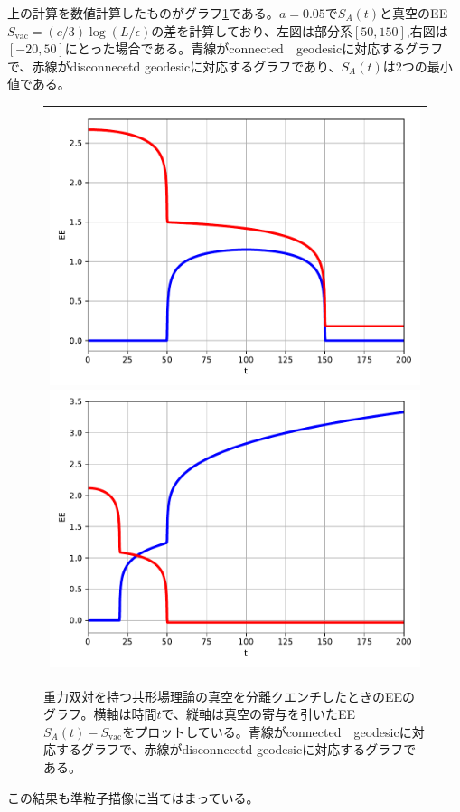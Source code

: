 上の計算を数値計算したものがグラフ\ref{fig:sh005}である。$a=0.05$で$S_A(t)$と真空のEE$S_\text{vac}=(c/3)\log(L/\epsilon)$の差を計算しており、左図は部分系$[50,150]$,右図は$[-20,50]$にとった場合である。青線がconnected　geodesicに対応するグラフで、赤線がdisconnecetd geodesicに対応するグラフであり、$S_A(t)$は2つの最小値である。
\begin{figure}[h]
	\centering
	\begin{tabular}{c}
		\begin{minipage}{0.50\hsize}
			\centering
			\includegraphics[width=\linewidth]{sh005_50_150.pdf}
		\end{minipage}
		\begin{minipage}{0.50\hsize}
			\centering
			\includegraphics[width=\linewidth]{sh005_20_50.pdf}
		\end{minipage}
	\end{tabular}
	\caption{重力双対を持つ共形場理論の真空を分離クエンチしたときのEEのグラフ。横軸は時間$t$で、縦軸は真空の寄与を引いたEE $S_A(t)-S_\text{vac}$をプロットしている。青線がconnected　geodesicに対応するグラフで、赤線がdisconnecetd geodesicに対応するグラフである。}
	\label{fig:sh005}
\end{figure}
この結果も準粒子描像に当てはまっている。

